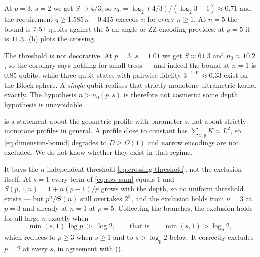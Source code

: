 \begin{example}
  \label{ex:crossing}
  At $p = 3$, $s = 2$ we get $S \to 4/3$, so $n_0 = \log_2(4/3) / (\log_2 3 - 1)
  \approx 0.71$ and the requirement
  $q \ge 1.585\,n - 0.415$ exceeds $n$ for every $n \ge 1$. At $n = 5$ the bound is
  $7.51$ qubits against the $5$ an angle or ZZ encoding provides; at
  $p = 5$ it is $11.3$. (b) plots the crossing.

  The threshold is not decorative. At $p = 3$, $s = 1.01$ we get $S \approx 61.3$ and
  $n_0 \approx 10.2$, so the corollary says nothing for small trees --- and indeed the
  bound at $n = 1$ is $0.85$ qubits, while three qubit states with pairwise fidelity
  $3^{-1.01} \approx 0.33$ exist on the Bloch sphere. A \emph{single} qubit realises
  that strictly monotone ultrametric kernel exactly. The hypothesis $n > n_0(p,s)$ is
  therefore not cosmetic: some depth hypothesis is unavoidable.
\end{example}

\begin{remark}[Scope]
  \label{rem:scope}
   is a statement about the geometric profile with parameter $s$,
  not about strictly monotone profiles in general. A profile close to constant has
  $\sum_{x,y} K \approx L^{2}$, so \cref{eq:dimension-bound} degrades to $D \ge \Omega(1)$
  and narrow encodings are not excluded. We do not know whether they exist in that
  regime.
\end{remark}

\begin{remark}
  \label{rem:s-greater-one}
  It buys the $n$-independent threshold \cref{eq:crossing-threshold}, not the exclusion
  itself. At $s = 1$ every term of \cref{eq:row-sum} equals $1$ and
  $S(p,1,n) = 1 + n(p-1)/p$ grows with the depth, so no uniform threshold exists ---
  but $p^{n}/\Theta(n)$ still overtakes $2^{n}$, and the exclusion holds from $n = 3$
  at $p = 3$ and already at $n = 1$ at $p = 5$. Collecting the branches, the exclusion
  holds for all large $n$ exactly when
  \begin{equation}
    \label{eq:exclusion-criterion}
    \min(s, 1) \, \log p \;>\; \log 2,
    \qquad\text{that is}\qquad \min(s,1) > \log_p 2 ,
  \end{equation}
  which reduces to $p \ge 3$ when $s \ge 1$ and to $s > \log_p 2$ below. It correctly
  excludes $p = 2$ at every $s$, in agreement with 
  ().
\end{remark}

